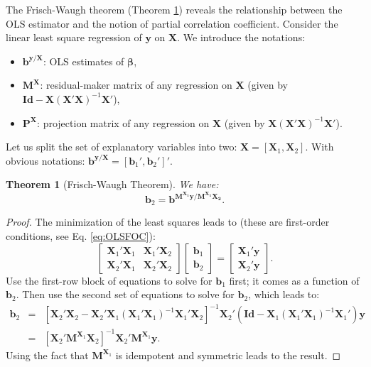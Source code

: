 \documentclass[
  11pt,
]{book}
\providecommand{\tightlist}{%
  \setlength{\itemsep}{0pt}\setlength{\parskip}{0pt}}
\newtheorem{theorem}{Theorem}[chapter]
\theoremstyle{definition}
\theoremstyle{definition}
\theoremstyle{definition}
\theoremstyle{definition}
\theoremstyle{remark}
\begin{document}
The Frisch-Waugh theorem (Theorem \ref{thm:FW}) reveals the relationship between the OLS estimator and the notion of partial correlation coefficient. Consider the linear least square regression of \(\mathbf{y}\) on \(\mathbf{X}\). We introduce the notations:

\begin{itemize}
\tightlist
\item
  \(\mathbf{b}^{\mathbf{y}/\mathbf{X}}\): OLS estimates of \(\boldsymbol\beta\),
\item
  \(\mathbf{M}^{\mathbf{X}}\): residual-maker matrix of any regression on \(\mathbf{X}\) (given by \(\mathbf{Id} - \mathbf{X} (\mathbf{X}'\mathbf{X})^{-1} \mathbf{X}'\)),
\item
  \(\mathbf{P}^{\mathbf{X}}\): projection matrix of any regression on \(\mathbf{X}\) (given by \(\mathbf{X} (\mathbf{X}'\mathbf{X})^{-1} \mathbf{X}'\)).
\end{itemize}

Let us split the set of explanatory variables into two: \(\mathbf{X} = [\mathbf{X}_1,\mathbf{X}_2]\). With obvious notations: \(\mathbf{b}^{\mathbf{y}/\mathbf{X}}=[\mathbf{b}_1',\mathbf{b}_2']'\).

\begin{theorem}[Frisch-Waugh Theorem]
\protect\hypertarget{thm:FW}{}\label{thm:FW}We have:
\[
\mathbf{b}_2 = \mathbf{b}^{\mathbf{M^{\mathbf{X}_1}y}/\mathbf{M^{\mathbf{X}_1}\mathbf{X}_2}}.
\]
\end{theorem}

\begin{proof}
The minimization of the least squares leads to (these are first-order conditions, see Eq. \eqref{eq:OLSFOC}):
\[
\left[ \begin{array}{cc} \mathbf{X}_1'\mathbf{X}_1 & \mathbf{X}_1'\mathbf{X}_2 \\ \mathbf{X}_2'\mathbf{X}_1 & \mathbf{X}_2'\mathbf{X}_2\end{array}\right]
\left[ \begin{array}{c} \mathbf{b}_1 \\ \mathbf{b}_2\end{array}\right] =
\left[ \begin{array}{c} \mathbf{X}_1' \mathbf{y} \\ \mathbf{X}_2' \mathbf{y} \end{array}\right].
\]
Use the first-row block of equations to solve for \(\mathbf{b}_1\) first; it comes as a function of \(\mathbf{b}_2\). Then use the second set of equations to solve for \(\mathbf{b}_2\), which leads to:
\begin{eqnarray*}
\mathbf{b}_2 &=& [\mathbf{X}_2'\mathbf{X}_2 - \mathbf{X}_2'\mathbf{X}_1(\mathbf{X}_1'\mathbf{X}_1)^{-1}\mathbf{X}_1'\mathbf{X}_2]^{-1}\mathbf{X}_2'(\mathbf{Id} - \mathbf{X}_1(\mathbf{X}_1'\mathbf{X}_1)^{-1}\mathbf{X}_1')\mathbf{y}\\
&=& [\mathbf{X}_2' \mathbf{M}^{\mathbf{X}_1}\mathbf{X}_2]^{-1}\mathbf{X}_2'\mathbf{M}^{\mathbf{X}_1}\mathbf{y}.
\end{eqnarray*}
Using the fact that \(\mathbf{M}^{\mathbf{X}_1}\) is idempotent and symmetric leads to the result.
\end{proof}
\end{document}
